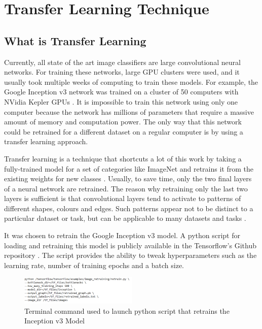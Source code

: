 \section{Transfer Learning Technique}

\subsection{What is Transfer Learning}

Currently, all state of the art image classifiers are large convolutional neural networks.  For training these networks, large GPU clusters were used, and it usually took multiple weeks of computing to train these models. For example,  the Google Inception v3 network was trained on a cluster of  50 computers with  NVidia Kepler GPUs \cite{incept}. It is impossible to train this network using only one computer because the network has millions of parameters that require a massive amount of memory and computation power. The only way that this network could be retrained for a different dataset on a regular computer is by using a transfer learning approach. 

Transfer learning is a technique that shortcuts a lot of this work by taking a fully-trained model for a set of categories like ImageNet and retrains it from the existing weights for new classes \citep{tensorflow}. Usually,  to save time, only the two final layers of a neural network are retrained. The reason why retraining only the last two layers is sufficient is that convolutional layers tend to activate to patterns of different shapes, colours and edges. Such patterns appear not to be distinct to a particular dataset or task, but can be applicable to many datasets and tasks \citep{transfer}.

It was chosen to retrain the Google Inception v3 model. A python script for loading and retraining this model is publicly available in the Tensorflow's Github repository \cite{gitretrain}. The script provides the ability to tweak hyperparameters such as the learning rate, number of training epochs and a batch size. 


\begin{figure}[h]
\centering
\includegraphics[width=0.5\textwidth]{Figures/4/term.PNG}
\caption{Terminal command used to launch python script that retrains the Inception v3 Model}
\label{fig:retrain}
\end{figure}

